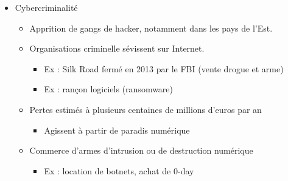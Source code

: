 \documentclass[11pt,a4paper]{article}
\begin{document}
	\begin{itemize}
		\item Cybercriminalité
		\begin{itemize}
			\item Apprition de gangs de hacker, notamment dans les pays de l'Est.
			\item Organisations criminelle sévissent sur Internet.
			\begin{itemize}
				\item Ex : Silk Road fermé en 2013 par le FBI (vente drogue et arme)
				\item Ex : rançon logiciels (ransomware)
			\end{itemize}
			\item Pertes estimés à plusieurs centaines de millions d'euros par an
			\begin{itemize}
				\item Agissent à partir de paradis numérique
			\end{itemize}
			\item Commerce d'armes d'intrusion ou de destruction numérique
			\begin{itemize}
				\item Ex : location de botnets, achat de 0-day
			\end{itemize}
		\end{itemize}
	\end{itemize}
\end{document}
